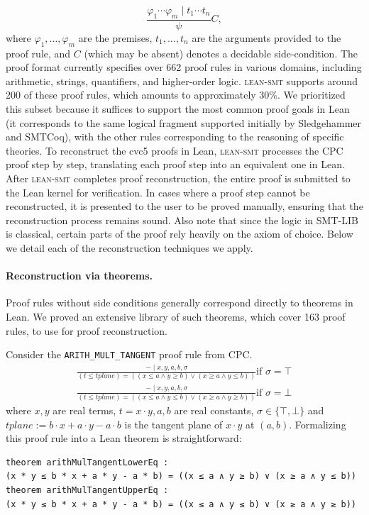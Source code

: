 \documentclass[runningheads]{llncs}
\newcommand{\tactic}{\textsc{lean-smt}\xspace}
\begin{document}
\[
\frac{\varphi_1 \cdots \varphi_m \mid t_1 \cdots t_n}{\psi}{C},
\]
\noindent
where $\varphi_1, \ldots, \varphi_m$ are the premises, $t_1, \ldots, t_n$ are
the arguments provided to the proof rule, and $C$ (which may be absent) denotes a decidable side-condition.
%
The proof format currently specifies over 662 proof rules in various domains,
including arithmetic, strings, quantifiers, and higher-order logic. \tactic supports
around 200 of these proof rules, which amounts to approximately 30\%. We prioritized this subset because it suffices to support the most common proof goals in Lean (it corresponds to the same logical fragment supported initially by Sledgehammer and SMTCoq), with the other rules corresponding to the reasoning of specific theories.
%
To reconstruct the cvc5 proofs in Lean, \tactic processes the CPC proof step by step,
translating each proof step into an equivalent one in Lean.
%
After \tactic completes proof reconstruction, the entire proof is submitted to
the Lean kernel for verification.
%
In cases where a proof step cannot be reconstructed, it is presented to the user
to be proved manually, ensuring that the reconstruction process remains sound.
%
Also note that since the logic in SMT-LIB is classical, certain parts of the
proof rely heavily on the axiom of choice.
%
Below we detail each of the reconstruction techniques we apply.

\paragraph{Reconstruction via theorems.} Proof rules without side conditions
generally correspond directly to theorems in Lean. We
proved an extensive library of such theorems, which cover 163 proof rules, to use for proof reconstruction.

\begin{example}
Consider the \texttt{ARITH\_MULT\_TANGENT} proof rule from CPC.
\begin{align*}
    \frac{- \mid x, y, a, b, \sigma}{(t \leq tplane) = ((x \le a \wedge y \ge b) \vee (x \ge a \wedge y \le b))} \text{if } \sigma = \top\\
    \frac{- \mid x, y, a, b, \sigma}{(t \leq tplane) = ((x \le a \wedge y \le b) \vee (x \ge a \wedge y \ge b))} \text{if } \sigma = \bot
\end{align*}
where $x,y$ are real terms, $t=x\cdot y, a, b$ are real constants, $\sigma \in \{ \top, \bot\}$ and $tplane := b \cdot x + a\cdot y-a\cdot b$ is the tangent plane of $x\cdot y$ at $(a, b)$.
Formalizing this proof rule into a Lean theorem is straightforward:
\begin{lstlisting}
theorem arithMulTangentLowerEq :
(x * y ≤ b * x + a * y - a * b) = ((x ≤ a ∧ y ≥ b) ∨ (x ≥ a ∧ y ≤ b))
theorem arithMulTangentUpperEq :
(x * y ≤ b * x + a * y - a * b) = ((x ≤ a ∧ y ≤ b) ∨ (x ≥ a ∧ y ≥ b))
\end{lstlisting}

\end{example}
\end{document}
